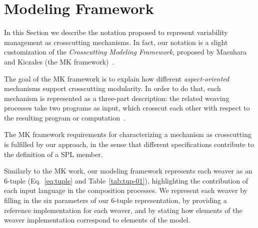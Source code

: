 \documentclass{sig-alt-full}
\begin{document}
%



\section{Modeling Framework}\label{sec:modeling-framework}

In this Section we describe the notation proposed to represent variability
management as crosscutting mechanisms. In fact, our notation is a slight
customization of the \emph{Crosscutting Modeling Framework}, proposed by Masuhara
and Kiczales (the MK framework)~\cite{Masuhara:2003aa}. 

The goal of the MK
framework is to explain how different \emph{aspect-oriented} mechanisms support
crosscutting modularity. In order to do that, each mechanism is represented as a
three-part description: the related weaving processes take two programs as input,
which crosscut each other with respect to the resulting program or
computation~\cite{Masuhara:2003aa}.

The MK framework requirements for characterizing a mechanism as crosscutting is fulfilled by our approach, in the sense that different specifications contribute to the
definition of a SPL member. 

Similarly to the MK work, our modeling framework represents each
weaver as an 6-tuple (Eq.~\ref{eq:tuple} and Table~\ref{tab:tup-01}),
highlighting the contribution of each input language in the composition
processes. We represent each weaver by filling in the six parameters of our
6-tuple representation, by providing a reference implementation for each weaver,
and by stating how elements of the weaver implementation correspond to elements
of the model.
\end{document}
